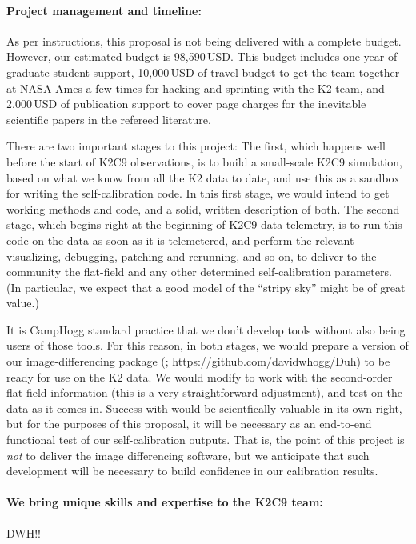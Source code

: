 \documentclass[12pt,preprint]{aastex}
\begin{document}
\paragraph{Project management and timeline:}

As per instructions, this proposal is not being delivered with a complete
budget.
However, our estimated budget is 98,590\,USD.
This budget includes one year of graduate-student support,
10,000\,USD of travel budget to get the team together at NASA Ames a
few times for hacking and sprinting with the K2 team,
and 2,000\,USD of publication support to cover page charges for
the inevitable scientific papers in the refereed literature.

There are two important stages to this project:
The first, which happens well before the start of K2C9 observations,
is to build a small-scale K2C9 simulation, based on what we know from
all the K2 data to date, and use this as a sandbox for writing the
self-calibration code.
In this first stage, we would intend to get working methods and code,
and a solid, written description of both.
The second stage, which begins right at the beginning of K2C9 data
telemetry, is to run this code on the data as soon as it is
telemetered, and perform the relevant visualizing, debugging,
patching-and-rerunning, and so on, to deliver to the community the
flat-field and any other determined self-calibration parameters.
(In particular, we expect that a good model of the ``stripy sky''
might be of great value.)

It is CampHogg standard practice that we don't develop tools without
also being users of those tools.
For this reason, in both stages, we would prepare a version of our
image-differencing package (; https://github.com/davidwhogg/Duh)
to be ready for use on the K2 data.
We would modify  to work with the second-order flat-field
information (this is a very straightforward adjustment), and test
 on the data as it comes in.
Success with  would be scientfically valuable in its own
right, but for the purposes of this proposal, it will be necessary as
an end-to-end functional test of our self-calibration outputs.
That is, the point of this project is \emph{not} to deliver the image
differencing software, but we anticipate that such development will be
necessary to build confidence in our calibration results.

\paragraph{We bring unique skills and expertise to the K2C9 team:}

DWH!!
\end{document}
